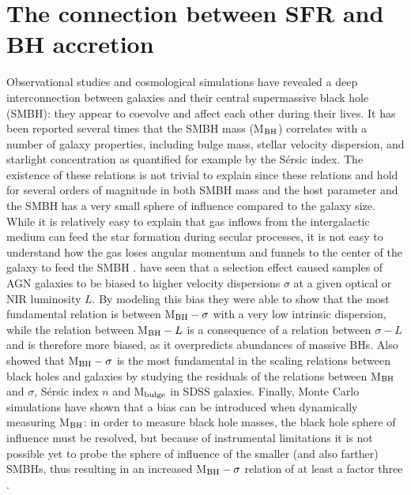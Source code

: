 \section{The connection between SFR and BH accretion}
Observational studies and cosmological simulations have revealed a deep interconnection between galaxies and their central supermassive black hole (SMBH): they appear to coevolve and affect each other during their lives.
It has been reported several times that the SMBH mass (M$_{\rm BH}$) correlates with a number of galaxy properties, including bulge mass, stellar velocity dispersion, and starlight concentration as quantified for example by the S\'{e}rsic index. The existence of these relations is not trivial to explain since these relations and hold for several orders of magnitude in both SMBH mass and the host parameter and the SMBH has a very small sphere of influence compared to the galaxy size. While it is relatively easy to explain that gas inflows from the intergalactic medium can feed the star formation during secular processes, it is not easy to understand how the gas loses angular momentum and funnels to the center of the galaxy to feed the SMBH \citep{2019NatAs...3...48S}. %
\citet{2007ApJ...660..267B} have seen that a selection effect caused samples of AGN galaxies to be biased to higher velocity dispersions $\sigma$ at a given optical or NIR luminosity $L$. By modeling this bias they were able to show
that the most fundamental relation is between M$_{\rm BH}-\sigma$ with a very low intrinsic dispersion, while the relation between M$_{\rm BH}- L$ is a consequence of a relation between $\sigma-L$ and is therefore more biased, as it overpredicts abundances of massive BHs. %
Also \citet{2017MNRAS.466.4029S} showed that M$_{\rm BH}-\sigma$ is the most fundamental in the scaling relations between black holes and galaxies by studying the residuals of the relations between M$_{\rm BH}$ and $\sigma$, S\'{e}rsic index $n$ and M$_{\rm bulge}$ in SDSS galaxies. Finally, Monte Carlo simulations have shown that a bias can be introduced when dynamically measuring M$_{\rm BH}$: in order to measure black hole masses, the black hole sphere of influence must be resolved, but because of instrumental limitations it is not possible yet to probe the sphere of influence of the smaller (and also farther) SMBHs, thus resulting in an increased M$_{\rm BH}-\sigma$ relation of at least a factor three \citep{2016MNRAS.460.3119S}.
